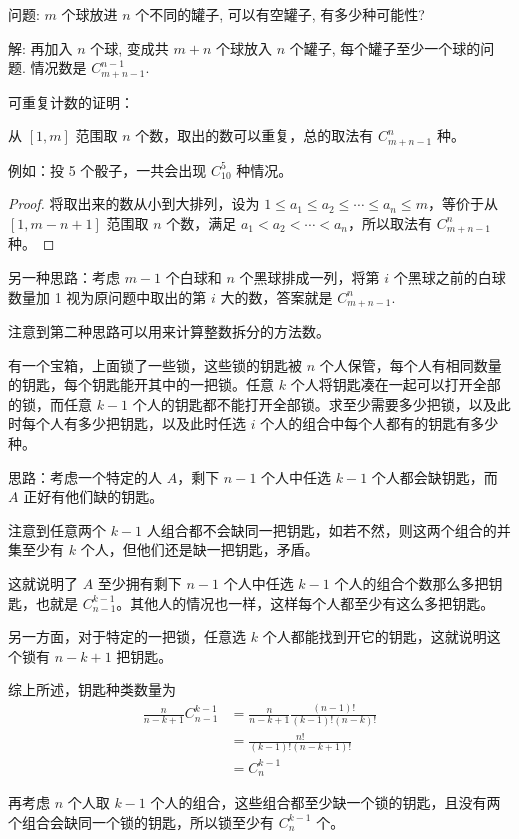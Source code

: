 \vbox{}

问题: $m$ 个球放进 $n$ 个不同的罐子, 可以有空罐子, 有多少种可能性?

解: 再加入 $n$ 个球, 变成共 $m+n$ 个球放入 $n$ 个罐子, 每个罐子至少一个球的问题. 情况数是 $C_{m+n-1}^{n-1}$.

\newpage


可重复计数的证明：

从 $ [1,m] $ 范围取 $ n $ 个数，取出的数可以重复，总的取法有 $ C_{m+n-1}^n $ 种。 

例如：投 5 个骰子，一共会出现 $ C_{10}^{5} $ 种情况。

\begin{proof}

将取出来的数从小到大排列，设为 $ 1 \le a_1 \le a_2 \le \cdots \le a_n \le m $，等价于从 $ [1,m-n+1] $ 范围取 $ n $ 个数，满足 $ a_1 < a_2 < \cdots < a_n $，所以取法有 $ C_{m+n-1}^n $ 种。

\end{proof}

另一种思路：考虑 $ m - 1 $ 个白球和 $ n $ 个黑球排成一列，将第 $ i $ 个黑球之前的白球数量加 1 视为原问题中取出的第 $ i $ 大的数，答案就是 $ C_{m+n-1}^n $.

注意到第二种思路可以用来计算整数拆分的方法数。

\newpage


有一个宝箱，上面锁了一些锁，这些锁的钥匙被 $ n $ 个人保管，每个人有相同数量的钥匙，每个钥匙能开其中的一把锁。任意 $ k $ 个人将钥匙凑在一起可以打开全部的锁，而任意 $ k - 1 $ 个人的钥匙都不能打开全部锁。求至少需要多少把锁，以及此时每个人有多少把钥匙，以及此时任选 $ i $ 个人的组合中每个人都有的钥匙有多少种。

思路：考虑一个特定的人 $ A $，剩下 $ n - 1 $ 个人中任选 $ k - 1 $ 个人都会缺钥匙，而 $ A $ 正好有他们缺的钥匙。

注意到任意两个 $ k - 1 $ 人组合都不会缺同一把钥匙，如若不然，则这两个组合的并集至少有 $ k $ 个人，但他们还是缺一把钥匙，矛盾。

这就说明了 $ A $ 至少拥有剩下 $ n - 1 $ 个人中任选 $ k - 1 $ 个人的组合个数那么多把钥匙，也就是 $ C_{n-1}^{k-1} $。其他人的情况也一样，这样每个人都至少有这么多把钥匙。

另一方面，对于特定的一把锁，任意选 $ k $ 个人都能找到开它的钥匙，这就说明这个锁有 $ n - k + 1 $ 把钥匙。

综上所述，钥匙种类数量为 
\begin{align*} 
\frac{n}{n-k+1}C_{n-1}^{k-1} &= \frac{n}{n-k+1}\frac{(n-1)!}{(k-1)!(n-k)!} \\
				&=\frac{n!}{(k-1)!(n-k+1)!} \\
				&=C_n^{k-1}
\end{align*}

再考虑 $ n $ 个人取 $ k - 1 $ 个人的组合，这些组合都至少缺一个锁的钥匙，且没有两个组合会缺同一个锁的钥匙，所以锁至少有 $ C_n^{k-1} $ 个。













